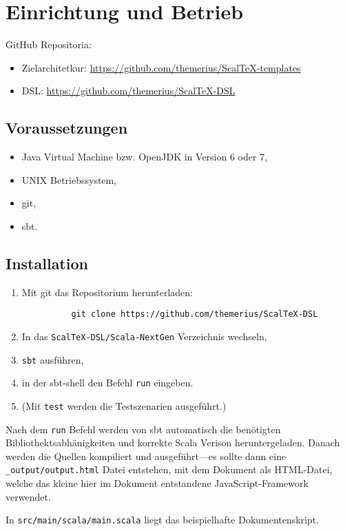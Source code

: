 \chapter{Einrichtung und Betrieb}

GitHub Repositoria:

\begin{itemize}
  \item Zielarchitetkur: \url{https://github.com/themerius/ScalTeX-templates}
  \item DSL: \url{https://github.com/themerius/ScalTeX-DSL}
\end{itemize}

\section{Voraussetzungen}

\begin{itemize}
  \item Java Virtual Machine bzw. OpenJDK in Version 6 oder 7,
  \item UNIX Betriebssystem,
  \item git,
  \item sbt.
\end{itemize}

\section{Installation}

\begin{enumerate}
  \item Mit git das Repositorium herunterladen:
        \begin{verbatim}
          git clone https://github.com/themerius/ScalTeX-DSL
        \end{verbatim}
  \item In das \verb+ScalTeX-DSL/Scala-NextGen+ Verzeichnis wechseln,
  \item \verb+sbt+ ausführen,
  \item in der sbt-shell den Befehl \verb+run+ eingeben.
  \item (Mit \verb+test+ werden die Testszenarien ausgeführt.)
\end{enumerate}

Nach dem \verb+run+ Befehl werden von sbt automatisch die benötigten
Bibliothektsabhänigkeiten und korrekte Scala Verison heruntergeladen.
Danach werden die Quellen kompiliert und ausgeführt---es sollte dann eine
\verb+_output/output.html+ Datei entstehen, mit dem Dokument als HTML-Datei,
welche das kleine hier im Dokument entstandene JavaScript-Framework verwendet.

In \verb+src/main/scala/main.scala+ liegt das
beispielhafte Dokumentenskript.